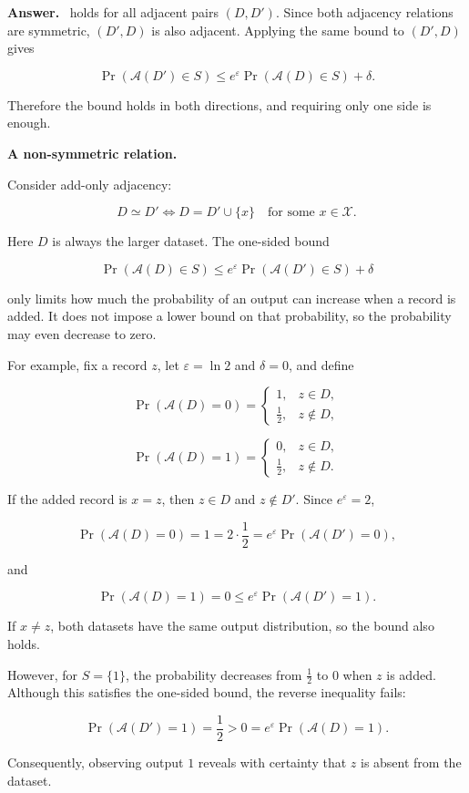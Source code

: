 \documentclass[11pt]{article}
\newcommand{\cA}{\mathcal{A}}
\newcommand{\eps}{\varepsilon}
\newenvironment{answer}{\par\medskip\noindent\textbf{Answer.}\ }{\par\bigskip}
\begin{document}
\begin{enumerate}
\begin{answer}
holds for all adjacent pairs $(D, D')$.
Since both adjacency relations are symmetric, $(D', D)$ is also adjacent.
Applying the same bound to $(D', D)$ gives

\[
  \Pr(\cA(D')\in S)\le e^{\eps}\Pr(\cA(D)\in S)+\delta .
\]

Therefore the bound holds in both directions, and requiring only one side
is enough.

\textbf{A non-symmetric relation.}

Consider add-only adjacency:

\[
D \simeq D' \iff D = D' \cup \{x\}
\quad \text{for some } x \in \mathcal{X}.
\]

Here $D$ is always the larger dataset. The one-sided bound

\[
\Pr(\cA(D)\in S)
\le e^\eps \Pr(\cA(D')\in S)+\delta
\]

only limits how much the probability of an output can
increase when a record is added. It does not impose
a lower bound on that probability, so the probability
may even decrease to zero.

For example, fix a record $z$, let $\eps=\ln 2$
and $\delta=0$, and define

\[
\Pr(\cA(D)=0)=
\begin{cases}
1, & z\in D,\\
\frac12, & z\notin D,
\end{cases}
\]

\[
\Pr(\cA(D)=1)=
\begin{cases}
0, & z\in D,\\
\frac12, & z\notin D.
\end{cases}
\]

If the added record is $x=z$, then $z\in D$
and $z\notin D'$. Since $e^\eps=2$,

\[
\Pr(\cA(D)=0)
=1
=2\cdot\frac12
=e^\eps\Pr(\cA(D')=0),
\]

and

\[
\Pr(\cA(D)=1)=0
\le e^\eps\Pr(\cA(D')=1).
\]

If $x\neq z$, both datasets have the same
output distribution, so the bound also holds.

However, for $S=\{1\}$, the probability decreases
from $\frac12$ to $0$ when $z$ is added.
Although this satisfies the one-sided bound,
the reverse inequality fails:

\[
\Pr(\cA(D')=1)
=\frac12
>0
=e^\eps\Pr(\cA(D)=1).
\]

Consequently, observing output $1$ reveals
with certainty that $z$ is absent from the dataset.


\end{answer}
\end{enumerate}
\end{document}
